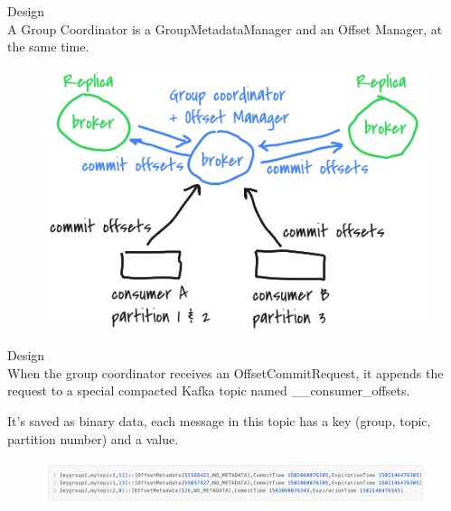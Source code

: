 \begin{frame}[plain,t]{Design} %
     \\
    \vspace{2ex}
   A Group Coordinator is a GroupMetadataManager and an Offset Manager,  at the same time.
   
   \begin{figure}
       \centering
       \includegraphics[width=0.7\linewidth]{image/0306}
       \label{fig:0306}
   \end{figure}
    
\end{frame}


\begin{frame}[plain,t]{Design} %
     \\
    \vspace{2ex}
   When the group coordinator receives an OffsetCommitRequest, it appends the request to a special compacted Kafka topic named \_\_consumer\_offsets.
   
   \vspace{2ex}
   It’s saved as binary data, each message in this topic has a key (group, topic, partition number) and a value.
   
    \vspace{2ex}
   
   \begin{figure}
       \centering
       \includegraphics[width=1\linewidth]{image/0219}
       \label{fig:0219}
   \end{figure}
    
\end{frame}


